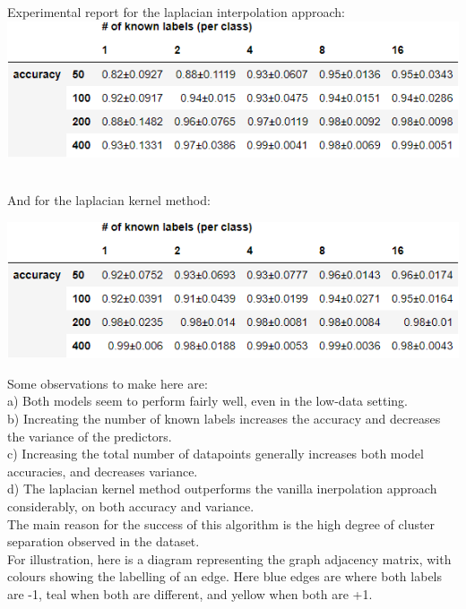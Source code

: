 \documentclass[12pt]{article}
\begin{document}
Experimental report for the laplacian interpolation approach:
\\

\includegraphics{outputs/part2/laplacian_interpolation_report.png}

\\

And for the laplacian kernel method:

\includegraphics{outputs/part2/laplacian_kernel_interpolation_report.png}

Some observations to make here are:\\


a) Both models seem to perform fairly well, even in the low-data setting.\\

b) Increating the number of known labels increases the accuracy and decreases
 the variance of the predictors.\\

c) Increasing the total number of datapoints generally increases both model accuracies,
and decreases variance. \\

d) The laplacian kernel method outperforms the vanilla inerpolation approach considerably,
on both accuracy and variance. \\


The main reason for the success of this algorithm is the high degree of
 cluster separation observed in the dataset.
\\

For illustration, here is a diagram representing the graph adjacency matrix,
 with colours showing the labelling of an edge. Here blue edges are where both 
labels are -1, teal when both are different, and yellow when both are +1.\\
\end{document}

